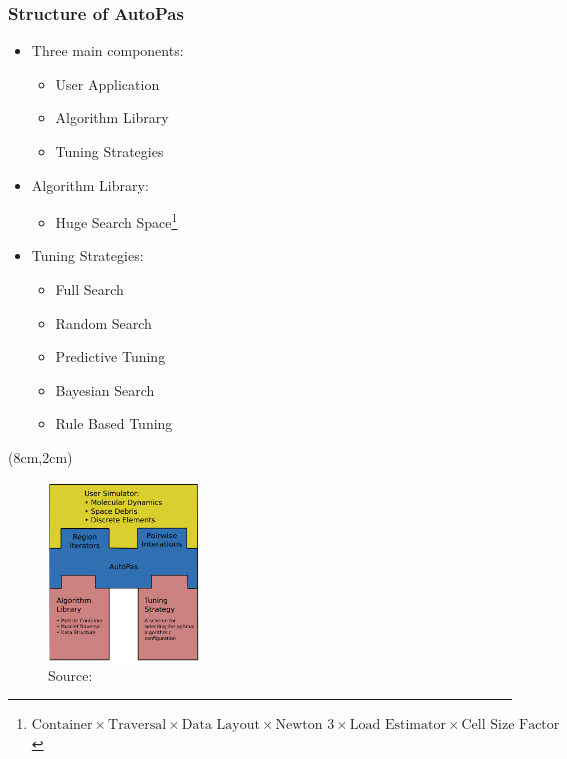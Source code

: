 \documentclass[
	10pt,
	t		%
]{beamer}
\begin{document}
\begin{frame}
	\frametitle{Structure of AutoPas}

	\begin{itemize}
		\item Three main components:
		      \begin{itemize}
			      \item User Application
			      \item Algorithm Library
			      \item Tuning Strategies
		      \end{itemize}
		\item Algorithm Library:
		      \begin{itemize}
			      \item Huge Search Space\footnote{\scriptsize{$\text{Container}\times\text{Traversal} \times \text{Data Layout} \times \text{Newton 3} \times \text{Load Estimator} \times \text{Cell Size Factor}$}
			            }
		      \end{itemize}
		\item Tuning Strategies:
		      \begin{itemize}
			      \item Full Search
			      \item Random Search
			      \item Predictive Tuning
			      \item Bayesian Search
			      \item Rule Based Tuning
		      \end{itemize}
	\end{itemize}

	\begin{textblock*}{4cm}(8cm,2cm)
		\begin{figure}
			\includegraphics[width=4cm]{figures/AutoPasLibraryStructure.png}
			\caption{ \footnotesize{Source: \cite{Newcome2023Poster}}}

		\end{figure}
	\end{textblock*}
\end{frame}
\end{document}
